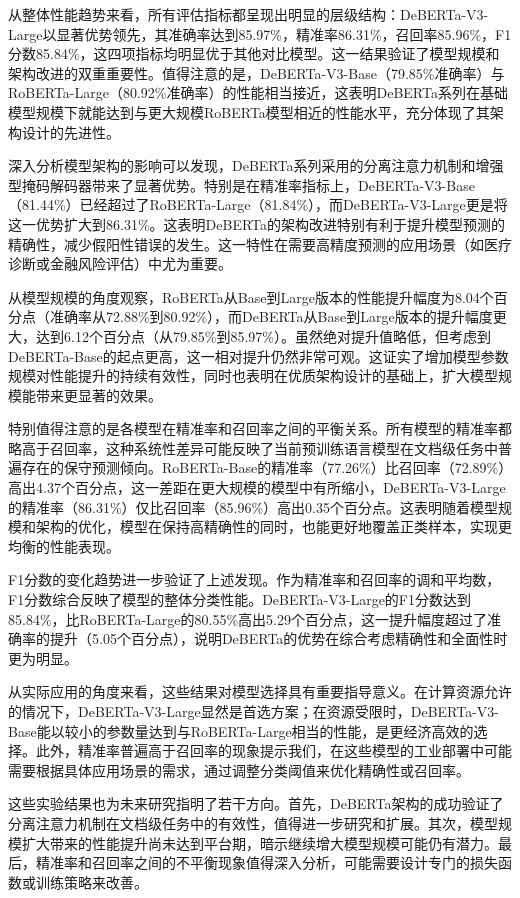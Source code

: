 从整体性能趋势来看，所有评估指标都呈现出明显的层级结构：DeBERTa-V3-Large以显著优势领先，其准确率达到85.97\%，精准率86.31\%，召回率85.96\%，F1分数85.84\%，这四项指标均明显优于其他对比模型。这一结果验证了模型规模和架构改进的双重重要性。值得注意的是，DeBERTa-V3-Base（79.85\%准确率）与RoBERTa-Large（80.92\%准确率）的性能相当接近，这表明DeBERTa系列在基础模型规模下就能达到与更大规模RoBERTa模型相近的性能水平，充分体现了其架构设计的先进性。

深入分析模型架构的影响可以发现，DeBERTa系列采用的分离注意力机制和增强型掩码解码器带来了显著优势。特别是在精准率指标上，DeBERTa-V3-Base（81.44\%）已经超过了RoBERTa-Large（81.84\%），而DeBERTa-V3-Large更是将这一优势扩大到86.31\%。这表明DeBERTa的架构改进特别有利于提升模型预测的精确性，减少假阳性错误的发生。这一特性在需要高精度预测的应用场景（如医疗诊断或金融风险评估）中尤为重要。

从模型规模的角度观察，RoBERTa从Base到Large版本的性能提升幅度为8.04个百分点（准确率从72.88\%到80.92\%），而DeBERTa从Base到Large版本的提升幅度更大，达到6.12个百分点（从79.85\%到85.97\%）。虽然绝对提升值略低，但考虑到DeBERTa-Base的起点更高，这一相对提升仍然非常可观。这证实了增加模型参数规模对性能提升的持续有效性，同时也表明在优质架构设计的基础上，扩大模型规模能带来更显著的效果。

特别值得注意的是各模型在精准率和召回率之间的平衡关系。所有模型的精准率都略高于召回率，这种系统性差异可能反映了当前预训练语言模型在文档级任务中普遍存在的保守预测倾向。RoBERTa-Base的精准率（77.26\%）比召回率（72.89\%）高出4.37个百分点，这一差距在更大规模的模型中有所缩小，DeBERTa-V3-Large的精准率（86.31\%）仅比召回率（85.96\%）高出0.35个百分点。这表明随着模型规模和架构的优化，模型在保持高精确性的同时，也能更好地覆盖正类样本，实现更均衡的性能表现。

F1分数的变化趋势进一步验证了上述发现。作为精准率和召回率的调和平均数，F1分数综合反映了模型的整体分类性能。DeBERTa-V3-Large的F1分数达到85.84\%，比RoBERTa-Large的80.55\%高出5.29个百分点，这一提升幅度超过了准确率的提升（5.05个百分点），说明DeBERTa的优势在综合考虑精确性和全面性时更为明显。

从实际应用的角度来看，这些结果对模型选择具有重要指导意义。在计算资源允许的情况下，DeBERTa-V3-Large显然是首选方案；在资源受限时，DeBERTa-V3-Base能以较小的参数量达到与RoBERTa-Large相当的性能，是更经济高效的选择。此外，精准率普遍高于召回率的现象提示我们，在这些模型的工业部署中可能需要根据具体应用场景的需求，通过调整分类阈值来优化精确性或召回率。

这些实验结果也为未来研究指明了若干方向。首先，DeBERTa架构的成功验证了分离注意力机制在文档级任务中的有效性，值得进一步研究和扩展。其次，模型规模扩大带来的性能提升尚未达到平台期，暗示继续增大模型规模可能仍有潜力。最后，精准率和召回率之间的不平衡现象值得深入分析，可能需要设计专门的损失函数或训练策略来改善。

